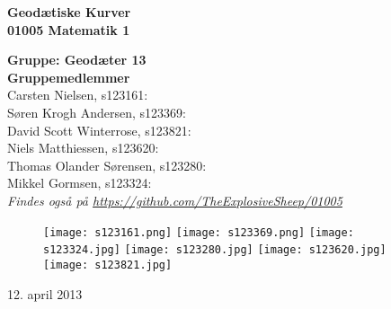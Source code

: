 \thispagestyle{empty} %
\begin{center}
\textbf{\Huge {Geodætiske Kurver}\\ \vspace{1cm}
\huge{01005 Matematik 1}}
\end{center}
\vspace{1cm}
\begin{center}
\Large{\textbf{Gruppe: Geodæter 13}} \\
\vspace{1cm}
\Large{\textbf{Gruppemedlemmer}} \\
Carsten Nielsen, s123161: \\
Søren Krogh Andersen, s123369: \\
David Scott Winterrose, s123821: \\
Niels Matthiessen, s123620: \\
Thomas Olander Sørensen, s123280: \\
Mikkel Gormsen, s123324: \\
\emph{Findes også på \url{https://github.com/TheExplosiveSheep/01005}}
\end{center}
\vspace{6cm}
\begin{figure}[h]
\hfill
\texttt{[image: s123161.png]}%
\texttt{[image: s123369.png]}%
\texttt{[image: s123324.jpg]}%
\texttt{[image: s123280.jpg]}%
\texttt{[image: s123620.jpg]}%
\texttt{[image: s123821.jpg]}%
\end{figure}
12. april 2013

\thispagestyle{empty}
\newpage

